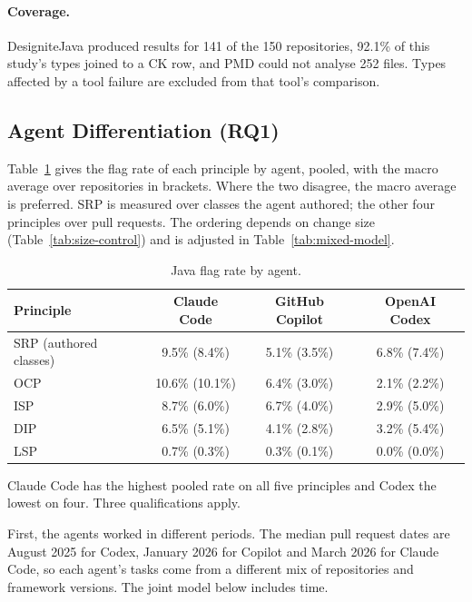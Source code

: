 \paragraph{Coverage.} DesigniteJava produced results for 141 of the 150 repositories, 92.1\% of this
study's types joined to a CK row, and PMD could not analyse 252 files. Types affected by a tool
failure are excluded from that tool's comparison.

\subsection{Agent Differentiation (RQ1)}
\label{sec:agent-differentiation}

Table~\ref{tab:agent-rates} gives the flag rate of each principle by agent, pooled, with the macro
average over repositories in brackets. Where the two disagree, the macro average is
preferred. SRP is measured over classes the agent authored; the other four principles over pull
requests. The ordering depends on change size (Table~\ref{tab:size-control}) and is adjusted in
Table~\ref{tab:mixed-model}.

\begin{table}[htb]
\centering
\caption{Java flag rate by agent.}
\label{tab:agent-rates}
\begin{tabular}{@{}lccc@{}}
\toprule
\textbf{Principle} & \textbf{Claude Code} & \textbf{GitHub Copilot} & \textbf{OpenAI Codex} \\
\midrule
SRP (authored classes) & 9.5\% (8.4\%) & 5.1\% (3.5\%) & 6.8\% (7.4\%) \\
OCP & 10.6\% (10.1\%) & 6.4\% (3.0\%) & 2.1\% (2.2\%) \\
ISP & 8.7\% (6.0\%) & 6.7\% (4.0\%) & 2.9\% (5.0\%) \\
DIP & 6.5\% (5.1\%) & 4.1\% (2.8\%) & 3.2\% (5.4\%) \\
LSP & 0.7\% (0.3\%) & 0.3\% (0.1\%) & 0.0\% (0.0\%) \\
\bottomrule
\end{tabular}
\end{table}

Claude Code has the highest pooled rate on all five principles and Codex the lowest on four. Three
qualifications apply.

First, the agents worked in different periods. The median pull request dates are August 2025 for
Codex, January 2026 for Copilot and March 2026 for Claude Code, so each agent's tasks come from a
different mix of repositories and framework versions. The joint model below includes time.

